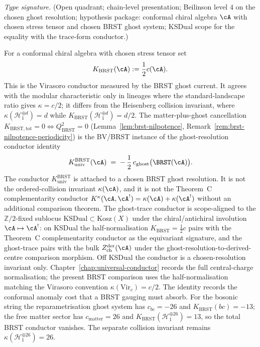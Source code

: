 \begin{remark}
\label{rem:bv-brst-universal-conductor}
\emph{Type signature.} (Open quadrant; chain-level presentation;
Beilinson level $4$ on the chosen ghost resolution; hypothesis
package: conformal chiral algebra $\cA$ with chosen stress tensor and
chosen BRST ghost system; KSDual scope for the equality with the
trace-form conductor.)

For a conformal chiral algebra with chosen stress tensor set
\[
 K_{\mathrm{BRST}}(\cA):=\frac{1}{2}c(\cA).
\]
This is the Virasoro conductor measured by the BRST ghost current. It
agrees with the modular characteristic only in lineages where the
standard-landscape ratio gives $\kappa=c/2$; it differs from the
Heisenberg collision invariant, where
$\kappa(\mathcal H^{\oplus d}_1)=d$ while
$K_{\mathrm{BRST}}(\mathcal H^{\oplus d}_1)=d/2$. The
matter-plus-ghost cancellation
$K_{\mathrm{BRST,tot}}=0\Leftrightarrow Q_{\mathrm{BRST}}^2=0$
(Lemma~\ref{lem:brst-nilpotence}, Remark~\ref{rem:brst-nilpotence-periodicity})
is the BV/BRST instance of the ghost-resolution conductor identity
\[
 K_{\mathrm{univ}}^{\mathrm{BRST}}(\cA)
 \;=\; -\,\frac{1}{2}\,
 c_{\mathrm{ghost}}\bigl(\BRST(\cA)\bigr).
\]
The conductor $K_{\mathrm{univ}}^{\mathrm{BRST}}$ is attached to a
chosen BRST ghost resolution. It is not the ordered-collision invariant
$\kappa(\cA)$, and it is not the Theorem~C complementarity conductor
$K^\kappa(\cA,\cA^!)=\kappa(\cA)+\kappa(\cA^!)$ without an additional
comparison theorem. The ghost-trace conductor is scope-aligned to the
$\mathbb{Z}/2$-fixed sublocus $\mathrm{KSDual}\subset\mathrm{Kosz}(X)$
under the chiral/antichiral involution $\cA\mapsto\cA^!$: on KSDual
the half-normalisation $K_{\mathrm{BRST}}=\tfrac12 c$ pairs with the
Theorem~C complementarity conductor as the equivariant signature, and
the ghost-trace pairs with the bulk
$Z^{\mathrm{der}}_{\mathrm{ch}}(\cA)$ under the
ghost-resolution-to-derived-centre comparison morphism. Off KSDual the
conductor is a chosen-resolution invariant only. Chapter~\ref{chap:universal-conductor} records the
full central-charge normalisation; the present BRST comparison uses the
half-normalisation matching the Virasoro convention
$\kappa(\mathrm{Vir}_c)=c/2$. The identity records the conformal anomaly
cost that a BRST gauging must absorb.
For the bosonic string the reparametrisation ghost system has
$c_{bc}=-26$ and $K_{\mathrm{BRST}}(bc)=-13$; the free matter sector
has $c_{\mathrm{matter}}=26$ and
$K_{\mathrm{BRST}}(\mathcal H^{\oplus 26}_1)=13$, so the total BRST
conductor vanishes. The separate collision invariant remains
$\kappa(\mathcal H^{\oplus 26}_1)=26$.


\end{remark}
